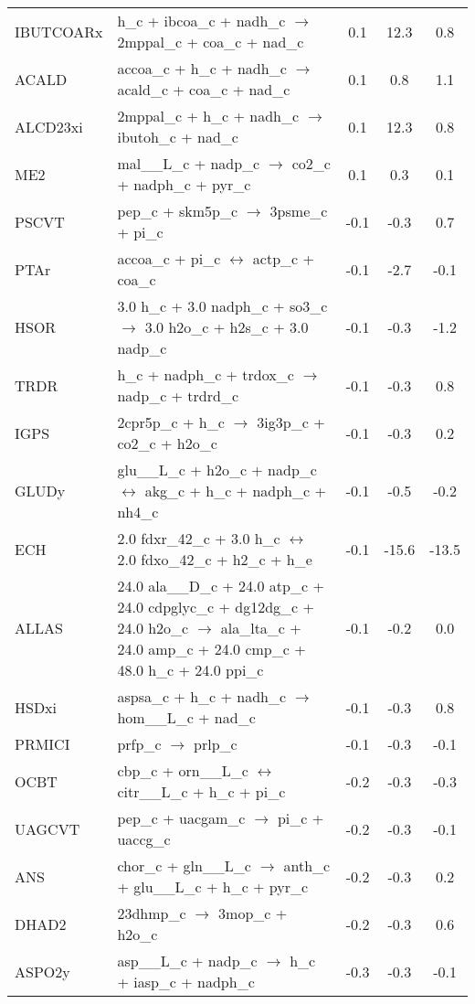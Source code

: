 \begin{longtable}{lp{}ccc}
IBUTCOARx	&	h\_c + ibcoa\_c + nadh\_c $\rightarrow$ 2mppal\_c + coa\_c + nad\_c	&	0.1	&	12.3	&	0.8	\\
ACALD	&	accoa\_c + h\_c + nadh\_c $\rightarrow$ acald\_c + coa\_c + nad\_c	&	0.1	&	0.8	&	1.1	\\
ALCD23xi	&	2mppal\_c + h\_c + nadh\_c $\rightarrow$ ibutoh\_c + nad\_c	&	0.1	&	12.3	&	0.8	\\
ME2	&	mal\_\_L\_c + nadp\_c $\rightarrow$ co2\_c + nadph\_c + pyr\_c	&	0.1	&	0.3	&	0.1	\\
PSCVT	&	pep\_c + skm5p\_c $\rightarrow$ 3psme\_c + pi\_c	&	-0.1	&	-0.3	&	0.7	\\
PTAr	&	accoa\_c + pi\_c $\leftrightarrow$ actp\_c + coa\_c	&	-0.1	&	-2.7	&	-0.1	\\
HSOR	&	3.0 h\_c + 3.0 nadph\_c + so3\_c $\rightarrow$ 3.0 h2o\_c + h2s\_c + 3.0 nadp\_c	&	-0.1	&	-0.3	&	-1.2	\\
TRDR	&	h\_c + nadph\_c + trdox\_c $\rightarrow$ nadp\_c + trdrd\_c	&	-0.1	&	-0.3	&	0.8	\\
IGPS	&	2cpr5p\_c + h\_c $\rightarrow$ 3ig3p\_c + co2\_c + h2o\_c	&	-0.1	&	-0.3	&	0.2	\\
GLUDy	&	glu\_\_L\_c + h2o\_c + nadp\_c $\leftrightarrow$ akg\_c + h\_c + nadph\_c + nh4\_c	&	-0.1	&	-0.5	&	-0.2	\\
ECH	&	2.0 fdxr\_42\_c + 3.0 h\_c $\leftrightarrow$ 2.0 fdxo\_42\_c + h2\_c + h\_e	&	-0.1	&	-15.6	&	-13.5	\\
ALLAS	&	24.0 ala\_\_D\_c + 24.0 atp\_c + 24.0 cdpglyc\_c + dg12dg\_c + 24.0 h2o\_c $\rightarrow$ ala\_lta\_c + 24.0 amp\_c + 24.0 cmp\_c + 48.0 h\_c + 24.0 ppi\_c	&	-0.1	&	-0.2	&	0.0	\\
HSDxi	&	aspsa\_c + h\_c + nadh\_c $\rightarrow$ hom\_\_L\_c + nad\_c	&	-0.1	&	-0.3	&	0.8	\\
PRMICI	&	prfp\_c $\rightarrow$ prlp\_c	&	-0.1	&	-0.3	&	-0.1	\\
OCBT	&	cbp\_c + orn\_\_L\_c $\leftrightarrow$ citr\_\_L\_c + h\_c + pi\_c	&	-0.2	&	-0.3	&	-0.3	\\
UAGCVT	&	pep\_c + uacgam\_c $\rightarrow$ pi\_c + uaccg\_c	&	-0.2	&	-0.3	&	-0.1	\\
ANS	&	chor\_c + gln\_\_L\_c $\rightarrow$ anth\_c + glu\_\_L\_c + h\_c + pyr\_c	&	-0.2	&	-0.3	&	0.2	\\
DHAD2	&	23dhmp\_c $\rightarrow$ 3mop\_c + h2o\_c	&	-0.2	&	-0.3	&	0.6	\\
ASPO2y	&	asp\_\_L\_c + nadp\_c $\rightarrow$ h\_c + iasp\_c + nadph\_c	&	-0.3	&	-0.3	&	-0.1	\\

\end{longtable}
